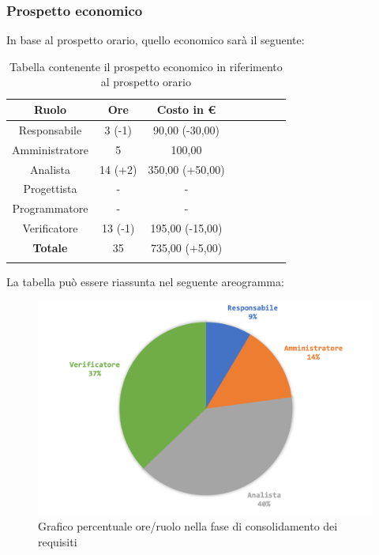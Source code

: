 		\subsubsection{Prospetto economico}
			In base al prospetto orario, quello economico sarà il seguente: 
			
			\begin{longtable}{|c|c|c|c|c|c|c|c}
				\hline
				\rowcolor{lighter-grayer}
				\textbf{Ruolo} & \textbf{Ore} & \textbf{Costo in €} \\
				\hline
				\endfirsthead
				
				\hline
				Responsabile & 3 (-1) & 90,00 (-30,00)\\
				\hline
				\hline
				Amministratore & 5 & 100,00\\
				\hline
				\hline
				Analista & 14 (+2) & 350,00 (+50,00)\\
				\hline
				\hline
				Progettista & - & -\\
				\hline
				\hline
				Programmatore & -  & -\\
				\hline
				\hline
				Verificatore & 13 (-1) & 195,00 (-15,00)\\
				\hline
				\textbf{Totale} & 35 & 735,00 (+5,00)\\
				\hline
				\caption{Tabella contenente il prospetto economico in riferimento al prospetto orario}
			\end{longtable}
			\pagebreak
			
			La tabella può essere riassunta nel seguente areogramma:
			\begin{figure}[H]
				\centering
				\includegraphics[width=0.8\linewidth]{images/consuntivo/ConsReqCons2.png}
				\caption{Grafico percentuale ore/ruolo nella fase di consolidamento dei requisiti}
				\label{fig:consuntivo grafico costi ruolo fase di consolidamento dei requisiti}
			\end{figure}
		
